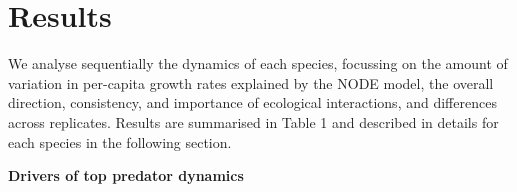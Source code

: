 \documentclass[11pt, oneside]{article}
\begin{document}
 

\section{Results}

We analyse sequentially the dynamics of each species, focussing on the amount of variation in per-capita growth rates explained by the NODE model, the overall direction, consistency, and importance of ecological interactions, and differences across replicates.
Results are summarised in Table 1 and described in details for each species in the following section.


\textbf{Drivers of top predator dynamics}
\end{document}

